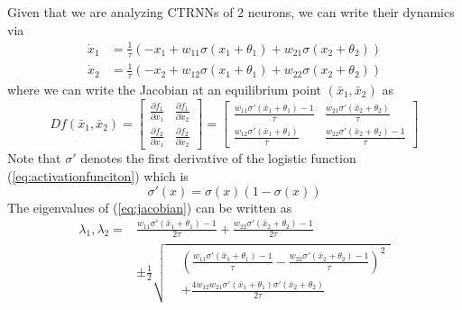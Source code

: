 \documentclass[11pt, letterpaper]{article}
\begin{document}
Given that we are analyzing CTRNNs of 2 neurons, we can write their dynamics via
\begin{equation}\label{eq:two_neuron}
\begin{split}
    \dot{x}_1 &= \frac{1}{\tau}\left( -x_1 + w_{11}\sigma \left( x_1 + \theta_1 \right) + w_{21}\sigma \left( x_2 + \theta_2 \right) \right) \\
    \dot{x}_2 &= \frac{1}{\tau}\left( -x_2 + w_{12}\sigma \left( x_1 + \theta_1 \right) + w_{22}\sigma \left( x_2 + \theta_2 \right) \right)
\end{split}
\end{equation}
where we can write the Jacobian at an equilibrium point $(\bar{x}_1, \bar{x}_2)$ as 
\begin{equation}\label{eq:jacobian}
    Df(\bar{x}_1, \bar{x}_2)=\begin{bmatrix}
    \frac{\partial f_1}{\partial x_1} & \frac{\partial f_1}{\partial x_2}\\
    \frac{\partial f_2}{\partial x_1} & \frac{\partial f_2}{\partial x_2}
    \end{bmatrix} = \begin{bmatrix}
    \frac{w_{11}\sigma'\left( \bar{x}_1 + \theta_1 \right)-1}{\tau} & \frac{w_{21}\sigma'\left( \bar{x}_2 + \theta_2 \right)}{\tau}\\
    \frac{w_{12}\sigma'\left( \bar{x}_1 + \theta_1 \right)}{\tau} & \frac{w_{22}\sigma'\left( \bar{x}_2 + \theta_2 \right)-1}{\tau}
    \end{bmatrix}
\end{equation}
Note that $\sigma'$ denotes the first derivative of the logistic function (\ref{eq:activationfunciton}) which is 
\begin{equation}
    \sigma'(x)=\sigma(x)\left( 1- \sigma(x) \right)
\end{equation}
The eigenvalues of (\ref{eq:jacobian}) can be written as
\begin{equation}\label{eq:eigenvalues}
\begin{split}
    \lambda_1,\lambda_2 = &\frac{w_{11}\sigma'(\bar{x}_1+\theta_1)-1}{2\tau} +\frac{w_{22}\sigma'(\bar{x}_2+\theta_2)-1}{2\tau}\\
    &\pm \frac{1}{2}\sqrt{\begin{aligned}
        &\left( \frac{w_{11}\sigma'\left( \bar{x}_1 + \theta_1 \right)-1}{\tau} - \frac{w_{22}\sigma'\left( \bar{x}_2 + \theta_2 \right)-1}{\tau} \right)^2\\
        &+\frac{4w_{12}w_{21}\sigma'\left(\bar{x}_1+\theta_1\right)\sigma'\left(\bar{x}_2+\theta_2\right)}{2\tau}
    \end{aligned}}
\end{split}
\end{equation}
\end{document}
